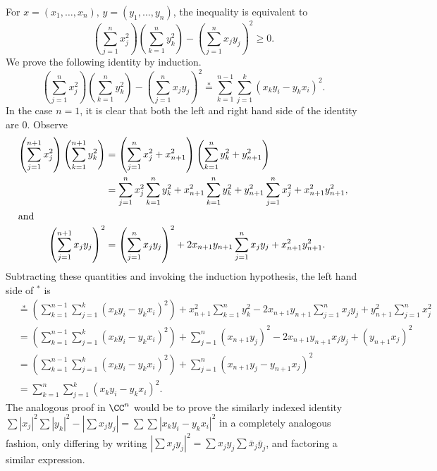 \documentclass{homework}
\begin{document}
\begin{solution}
  For $x=(x_1,\dots,x_n),\,y=(y_1,\dots,y_n)$, the inequality is equivalent to
  $$
    \left(\sum_{j=1}^n x_j^2 \right)\left(\sum_{k=1}^n y_k^2 \right) - \left( \sum_{j=1}^nx_j y_j\right)^2 \ge 0.
  $$
  We prove the following identity by induction.   
  $$
    \left(\sum_{j=1}^n x_j^2 \right)\left(\sum_{k=1}^n y_k^2 \right) - \left( \sum_{j=1}^nx_j y_j\right)^2
    \stackrel*= \sum_{k=1}^{n-1}\sum_{j=1}^k(x_k y_i - y_k x_i)^2.
  $$
  In the case $n=1$, it is clear that both the left and right hand side of the identity are $0$.
  Observe
  \begin{align*}
    \left(\sum_{j=1}^{n+1} x_j^2 \right)\left(\sum_{k=1}^{n+1} y_k^2 \right) 
    &= \left(\sum_{j=1}^n x_j^2 + x^2_{n+1}\right)\left(\sum_{k=1}^n y_k^2 + y^2_{n+1}\right) \\
    &= \sum_{j=1}^n x_j^2\sum_{k=1}^n y_k^2 + x^2_{n+1}\sum_{k=1}^n y_k^2 + y^2_{n+1}\sum_{j=1}^n x_j^2 + x_{n+1}^2y_{n+1}^2, \\
    \intertext{and}
    \left( \sum_{j=1}^{n+1}x_j y_j \right)^2 
    &= \left( \sum_{j=1}^nx_j y_j \right)^2 + 2x_{n+1}y_{n+1}\sum_{j=1}^n x_jy_j  + x_{n+1}^2y_{n+1}^2.
  \end{align*}
  Subtracting these quantities and invoking the induction hypothesis, the left hand side of $^*$ is
  \begin{align*}
    &\stackrel*= \left(\sum_{k=1}^{n-1}\sum_{j=1}^k(x_k y_i - y_k x_i)^2\right) + 
    x^2_{n+1}\sum_{k=1}^n y_k^2 -2x_{n+1}y_{n+1}\sum_{j=1}^n x_jy_j+ y^2_{n+1}\sum_{j=1}^n x_j^2\\
    &= \left(\sum_{k=1}^{n-1}\sum_{j=1}^k(x_k y_i - y_k x_i)^2\right) + 
    \sum_{j=1}^n (x_{n+1}y_j)^2 -2x_{n+1}y_{n+1}x_jy_j + (y_{n+1}x_j)^2\\
    &= \left(\sum_{k=1}^{n-1}\sum_{j=1}^k(x_k y_i - y_k x_i)^2\right) + 
    \sum_{j=1}^n (x_{n+1}y_j - y_{n+1}x_j)^2\\
    &= \sum_{k=1}^{n}\sum_{j=1}^k(x_k y_i - y_k x_i)^2.
  \end{align*}
  The analogous proof in $\CC^n$ would be to prove the similarly indexed identity $\sum|x_j|^2\sum|y_k|^2 - |\sum x_jy_j| = \sum\sum|x_ky_i - y_kx_i|^2$ in a completely analogous fashion, only differing by writing $|\sum x_jy_j|^2 = \sum x_jy_j \sum \bar x_j \bar y_j$, and factoring a similar expression.
  
\end{solution}

\end{document}
